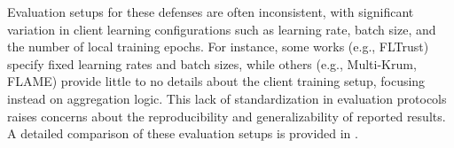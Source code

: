 Evaluation setups for these defenses are often inconsistent, with significant variation in client learning configurations such as learning rate, batch size, and the number of local training epochs. For instance, some works (e.g., FLTrust) specify fixed learning rates and batch sizes, while others (e.g., Multi-Krum, FLAME) provide little to no details about the client training setup, focusing instead on aggregation logic. This lack of standardization in evaluation protocols raises concerns about the reproducibility and generalizability of reported results. A detailed comparison of these evaluation setups is provided in .

